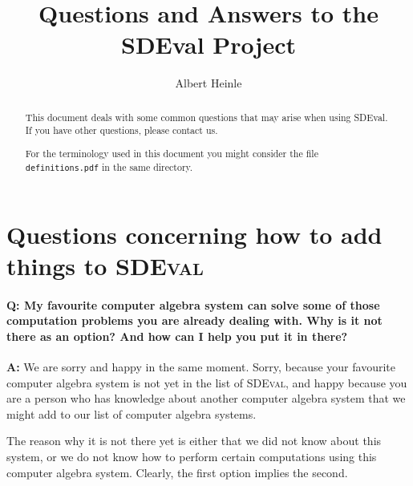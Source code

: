 \documentclass[11pt,a4paper]{amsart}
\numberwithin{equation}{section}
\theoremstyle{definition}
\begin{document}
\title{Questions and Answers to the SDEval Project}
\author{Albert Heinle}
\maketitle
\begin{abstract}
This document deals with some common questions that may arise when using SDEval.
If you have other questions, please contact us.

For the terminology used in this document you might consider the file \texttt{definitions.pdf} in the same directory.
\end{abstract}
\section{Questions concerning how to add things to \textsc{SDEval}}

\paragraph{\textbf{Q:} My favourite computer algebra system can solve some of those computation problems you are already dealing with. Why is it not there as an option? And how can I help you put it in there?}

\textbf{A:} We are sorry and happy in the same moment. Sorry, because your favourite computer algebra system is not yet in the list of \textsc{SDEval}, and happy because you are a
person who has knowledge about another computer algebra system that we might add
to our list of computer algebra systems.

The reason why it is not there yet is either that we did not know about this system, or we do not know how to perform certain computations using this computer algebra system. Clearly, the first option implies the second.
\end{document}
